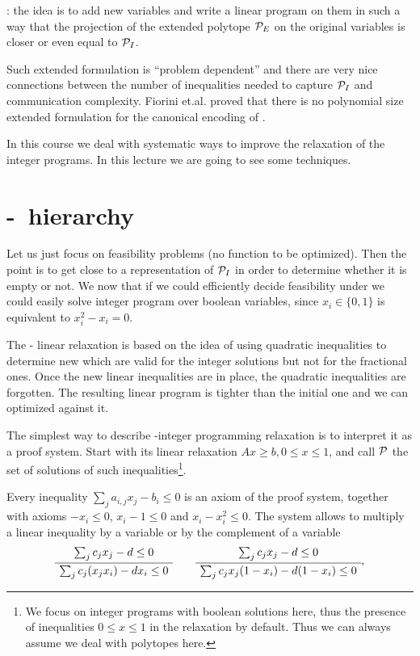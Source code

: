 \documentclass[a4paper,twoside,justified]{tufte-handout}
\begin{document}
: the idea is to add new variables
and write a linear program on them in such a way that the projection
of the extended polytope $\mathcal{P}_{E}$ on the original variables is
closer or even equal to $ \mathcal{P}_{I} $.

Such extended formulation is ``problem dependent'' and there are very
nice connections between the number of inequalities needed to capture
$ \mathcal{P}_{I} $ and communication complexity. Fiorini
et.al.\cite{fiorini2007linear} proved that there is no polynomial size
extended formulation for the canonical encoding of
.

In this course we deal with systematic ways to improve the relaxation
of the integer programs. In this lecture we are going to see some
techniques.

\section{\Lovasz-\Schrijver\ hierarchy}

Let us just focus on feasibility problems (no function to be
optimized). Then the point is to get close to a representation of $
\mathcal{P}_{I} $ in order to determine whether it is empty or not. We now
that if we could efficiently decide feasibility under
 we could easily solve integer
program over boolean variables, since $ x_{i}\in\{0,1\} $ is equivalent
to $ x^{2}_{i} - x_{i} =0 $. 

The \Lovasz-\Schrijver\cite{lovasz1991cones} linear relaxation is
based on the idea of using quadratic inequalities to determine new
 which are valid for the integer
solutions but not for the fractional ones. Once the new linear
inequalities are in place, the quadratic inequalities are forgotten.
The resulting linear program is tighter than the initial one and we
can optimized against it.

The simplest way to describe \Lovasz-\Schrijver integer programming
relaxation is to interpret it as a proof system. Start with its linear
relaxation $ Ax \geq b, 0 \leq x \leq 1$, and call $ \mathcal{P} $ the set
of solutions of such inequalities\footnote{We focus on integer
  programs with boolean solutions here, thus the presence of
  inequalities $ 0 \leq x \leq 1 $ in the relaxation by
  default. Thus we can always assume we deal with polytopes here.}.

Every inequality $ \sum_{j}a_{i,j}x_{j} - b_{i} \leq 0$ is an axiom of
the proof system, together with axioms $ - x_{i} \leq 0$, $ x_{i} - 1
\leq 0$ and $ x_{i} - x^{2}_{i} \leq 0$.  The system allows to multiply a
linear inequality by a variable or by the complement of a variable
\begin{equation}\label{eq:lsmultiplication}
\AxiomC{$\sum_{j}c_{j} x_{j} - d \leq 0$}
\UnaryInfC{$ \sum_{j}c_{j}(x_{j}x_{i}) - d x_{i} \leq 0$}
\DisplayProof
\qquad
\AxiomC{$ \sum_{j}c_{j} x_{j} - d \leq 0$}
\UnaryInfC{$ \sum_{j}c_{j}x_{j}(1-x_{i}) - d (1-x_{i}) \leq 0$}
\DisplayProof,
\end{equation}
\end{document}
